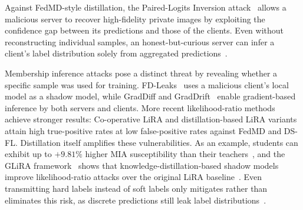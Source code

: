 Against FedMD-style distillation, the Paired-Logits Inversion attack~\cite{takahashi2023breaching} allows a malicious server to recover high-fidelity private images by exploiting the confidence gap between its predictions and those of the clients. Even without reconstructing individual samples, an honest-but-curious server can infer a client's label distribution solely from aggregated predictions~\cite{gu2023ldia, shi2025unveiling}.


Membership inference attacks pose a distinct threat by revealing whether a specific sample was used for training. FD-Leaks~\cite{yang2023fdleaks} uses a malicious client's local model as a shadow model, while GradDiff and GradDrift~\cite{wang2024graddiff} enable gradient-based inference by both servers and clients. More recent likelihood-ratio methods achieve stronger results: Co-operative LiRA and distillation-based LiRA variants~\cite{shi2025unveiling} attain high true-positive rates at low false-positive rates against FedMD and DS-FL. Distillation itself amplifies these vulnerabilities. As an example, students can exhibit up to $+9.81\%$ higher MIA susceptibility than their teachers~\cite{cui2025mia}, and the GLiRA framework~\cite{galichin2025glira} shows that knowledge-distillation-based shadow models improve likelihood-ratio attacks over the original LiRA baseline~\cite{carlini2022membership}. Even transmitting hard labels instead of soft labels only mitigates rather than eliminates this risk, as discrete predictions still leak label distributions~\cite{shao2024selective}.


